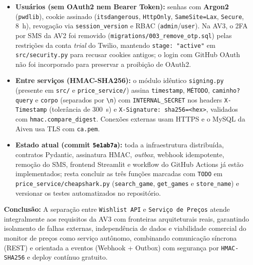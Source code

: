 \documentclass[11pt,a4paper]{article}
\begin{document}
\begin{itemize}
    \item \textbf{Usuários (sem OAuth2 nem Bearer Token):} senhas com \textbf{Argon2} (\texttt{pwdlib}), cookie assinado (\texttt{itsdangerous}, \texttt{HttpOnly}, \texttt{SameSite=Lax}, \texttt{Secure}, 8~h), revogação via \texttt{session\_version} e RBAC (\texttt{admin}/\texttt{user}). Na AV3, o 2FA por SMS da AV2 foi removido (\texttt{migrations/003\_remove\_otp.sql}) pelas restrições da conta \textit{trial} do Twilio, mantendo \texttt{stage: "active"} em \texttt{src/security.py} para recusar cookies antigos; o login com GitHub OAuth não foi incorporado para preservar a proibição de OAuth2.
    \item \textbf{Entre serviços (HMAC-SHA256):} o módulo idêntico \texttt{signing.py} (presente em \texttt{src/} e \texttt{price\_service/}) assina \texttt{timestamp}, \texttt{MÉTODO}, \texttt{caminho?query} e \texttt{corpo} (separados por \texttt{\textbackslash{}n}) com \texttt{INTERNAL\_SECRET} nos headers \texttt{X-Timestamp} (tolerância de 300~s) e \texttt{X-Signature: sha256=<hex>}, validados com \texttt{hmac.compare\_digest}. Conexões externas usam HTTPS e o MySQL da Aiven usa TLS com \texttt{ca.pem}.
    \item \textbf{Estado atual (commit \texttt{5e1ab7a}):} toda a infraestrutura distribuída, contratos Pydantic, assinatura HMAC, \textit{outbox}, webhook idempotente, remoção do SMS, frontend Streamlit e workflow do GitHub Actions já estão implementados; resta concluir as três funções marcadas com \texttt{TODO} em \texttt{price\_service/cheapshark.py} (\texttt{search\_game}, \texttt{get\_games} e \texttt{store\_name}) e versionar os testes automatizados no repositório.
\end{itemize}

\noindent\textbf{Conclusão:} A separação entre \texttt{Wishlist API} e \texttt{Serviço de Preços} atende integralmente aos requisitos da AV3 com fronteiras arquiteturais reais, garantindo isolamento de falhas externas, independência de dados e viabilidade comercial do monitor de preços como serviço autônomo, combinando comunicação síncrona (REST) e orientada a eventos (Webhook + Outbox) com segurança por \texttt{HMAC-SHA256} e deploy contínuo gratuito.
\end{document}
